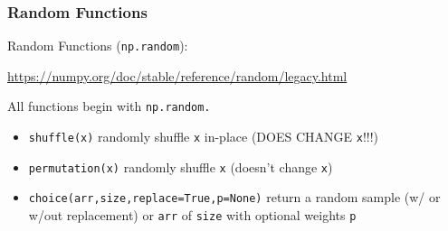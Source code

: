 \documentclass{beamer}
\newcommand{\code}[1]{\texttt{#1}}
\begin{document}
\begin{frame}	
	\frametitle{Random Functions}
	
	\begin{block}{Random Functions (\code{np.random}):}
		\begin{scriptsize}
		\href{https://numpy.org/doc/stable/reference/random/legacy.html}{https://numpy.org/doc/stable/reference/random/legacy.html}
		
		\vspace{10pt}
		All functions begin with \code{np.random.}
		\begin{itemize}
			\item \code{shuffle(x)} randomly shuffle \code{x} in-place (DOES CHANGE \code{x}!!!)
			\item \code{permutation(x)} randomly shuffle \code{x} (doesn't change \code{x})
			\item \code{choice(arr,size,replace=True,p=None)} return a random sample (w/ or w/out replacement) or \code{arr} of \code{size} with optional weights \code{p}
		\end{itemize}
		\end{scriptsize}
	\end{block}
	
\end{frame}
\end{document}

